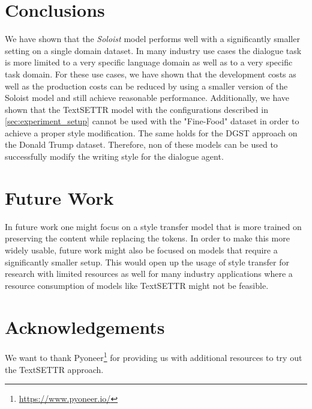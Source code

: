 \documentclass[twocolumn]{tum-article}
\begin{document}
\section{Conclusions}
We have shown that the \textit{Soloist} model performs well with a significantly smaller setting on a single domain dataset. In many industry use cases the dialogue task is more limited to a very specific language domain as well as to a very specific task domain. For these use cases, we have shown that the development costs as well as the production costs can be reduced by using a smaller version of the Soloist model and still achieve reasonable performance. Additionally, we have shown that the TextSETTR model with the configurations described in \autoref{sec:experiment_setup} cannot be used with the "Fine-Food" dataset in order to achieve a proper style modification. The same holds for the DGST approach on the Donald Trump dataset. Therefore, non of these models can be used to successfully modify the writing style for the dialogue agent.
\section{Future Work}
In future work one might focus on a style transfer model that is more trained on preserving the content while replacing the tokens. In order to make this more widely usable, future work might also be focused on models that require a significantly smaller setup. This would open up the usage of style transfer for research with limited resources as well for many industry applications where a resource consumption of models like TextSETTR might not be feasible.
\section*{Acknowledgements}
We want to thank Pyoneer\footnote{\url{https://www.pyoneer.io/}} for providing us with additional resources to try out the TextSETTR approach. 


\end{document}
